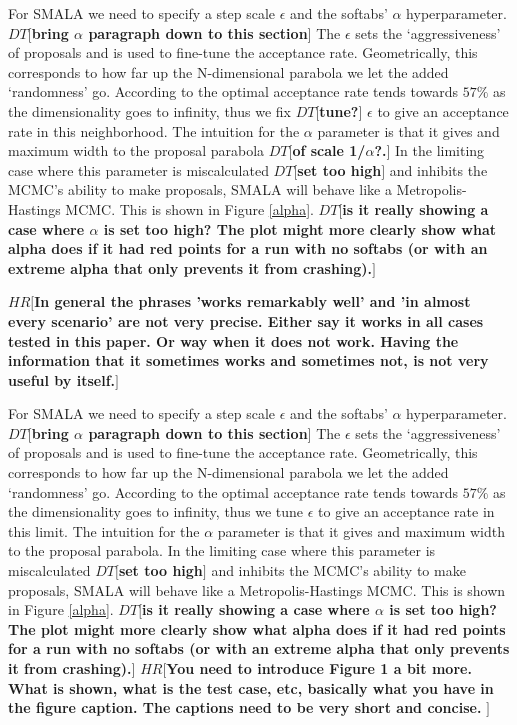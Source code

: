 \documentclass{aa}
\def\memohr#1{\color{blue}$HR[${\bf #1}$]$ \color{black}}
\def\memodt#1{\color{green}$DT[${\bf #1}$]$ \color{black}}
\begin{document}
 
For SMALA we need to specify a step scale $\epsilon$ and the softabs' $\alpha$ hyperparameter. \memodt{bring $\alpha$ paragraph down to this section}
The $\epsilon$ sets the `aggressiveness' of proposals and is used to fine-tune the acceptance rate. 
Geometrically, this corresponds to how far up the N-dimensional parabola we let the added `randomness' go. 
According to \cite{robert1998} the optimal acceptance rate tends towards $57\%$ as the dimensionality goes to infinity, thus we fix \memodt{tune?} $\epsilon$ to give an acceptance rate in this neighborhood. 
The intuition for the $\alpha$ parameter is that it gives and maximum width to the proposal parabola \memodt{of scale 1/$\alpha$?.}
In the limiting case where this parameter is miscalculated \memodt{set too high} and inhibits the MCMC's ability to make proposals, SMALA will behave like a Metropolis-Hastings MCMC. 
This is shown in Figure \ref{alpha}. \memodt{is it really showing a case where $\alpha$ is set too high? The plot might more clearly show what alpha does if it had red points for a run with no softabs (or with an extreme alpha that only prevents it from crashing).} 

\memohr{In general the phrases 'works remarkably well' and 'in almost every scenario' are not very precise. Either say it works in all cases tested in this paper. Or way when it does not work. Having the information that it sometimes works and sometimes not, is not very useful by itself.}

For SMALA we need to specify a step scale $\epsilon$ and the softabs' $\alpha$ hyperparameter. \memodt{bring $\alpha$ paragraph down to this section}
The $\epsilon$ sets the `aggressiveness' of proposals and is used to fine-tune the acceptance rate. 
Geometrically, this corresponds to how far up the N-dimensional parabola we let the added `randomness' go. 
According to \cite{robert1998} the optimal acceptance rate tends towards $57\%$ as the dimensionality goes to infinity, thus we tune $\epsilon$ to give an acceptance rate in this limit.
The intuition for the $\alpha$ parameter is that it gives and maximum width to the proposal parabola. 
In the limiting case where this parameter is miscalculated \memodt{set too high} and inhibits the MCMC's ability to make proposals, SMALA will behave like a Metropolis-Hastings MCMC. 
This is shown in Figure \ref{alpha}. \memodt{is it really showing a case where $\alpha$ is set too high? The plot might more clearly show what alpha does if it had red points for a run with no softabs (or with an extreme alpha that only prevents it from crashing).} 
\memohr{You need to introduce Figure 1 a bit more. What is shown, what is the test case, etc, basically what you have in the figure caption. The captions need to be very short and concise. }
\end{document}

